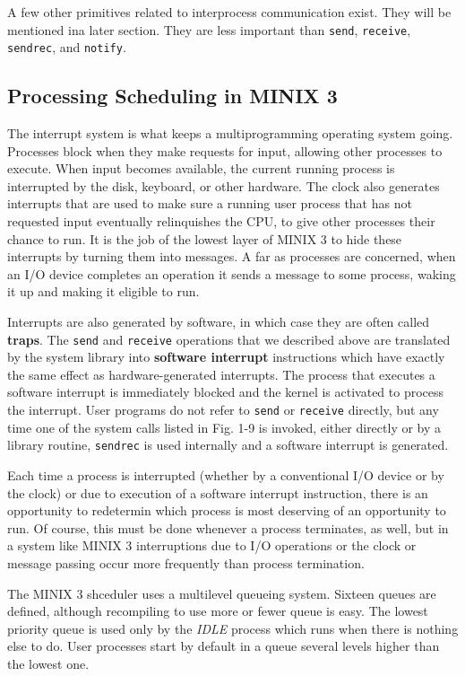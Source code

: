 \documentclass{book}
\newcommand {\kw}  [1] {\textbf{#1}}
\newcommand {\sys} [1] {\textsl{#1}}
\newcommand {\cmd} [1] {\texttt{#1}}
\begin{document}
A few other primitives related to interprocess communication exist.
They will be mentioned ina later section.
They are less important than \cmd{send}, \cmd{receive}, \cmd{sendrec}, and \cmd{notify}. 

\subsection{Processing Scheduling in MINIX 3}
The interrupt system is what keeps a multiprogramming operating system going.
Processes block when they make requests for input, allowing other processes to execute.
When input becomes available, the current running process is interrupted by the disk, keyboard, or other hardware.
The clock also generates interrupts that are used to make sure a running user process that has not requested input eventually relinquishes the CPU,
to give other processes their chance to run.
It is the job of the lowest layer of MINIX 3 to hide these interrupts by turning them into messages.
A far as processes are concerned, when an I/O device completes an operation it sends a message to some process, 
waking it up and making it eligible to run.

Interrupts are also generated by software, in which case they are often called \kw{traps}.
The \cmd{send} and \cmd{receive} operations that we described above are translated by the system library into \kw{software interrupt} instructions
which have exactly the same effect as hardware-generated interrupts.
The process that executes a software interrupt is immediately blocked and the kernel is activated to process the interrupt.
User programs do not refer to \cmd{send} or \cmd{receive} directly, but any time one of the system calls listed in Fig. 1-9 is invoked, 
either directly or by a library routine, \cmd{sendrec} is used internally and a software interrupt is generated.

Each time a process is interrupted (whether by a conventional I/O device or by the clock) or due to execution of a software interrupt instruction,
there is an opportunity to redetermin which process is most deserving of an opportunity to run.
Of course, this must be done whenever a process terminates, as well, but in a system like MINIX 3 interruptions due to I/O operations 
or the clock or message passing occur more frequently than process termination.

The MINIX 3 shceduler uses a multilevel queueing system.
Sixteen queues are defined, although recompiling to use more or fewer queue is easy.
The lowest priority queue is used only by the \sys{IDLE} process which runs when there is nothing else to do.
User processes start by default in a queue several levels higher than the lowest one.
\end{document}
